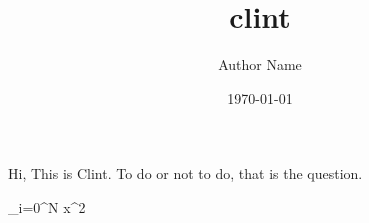 \documentclass{article}
\title{clint}
\author{Author Name}
\date{\today}
\begin{document}
\maketitle

Hi, This is Clint. To do or not to do, that is the question.

\sum_{i=0}^{N} x^2
\end{document}
